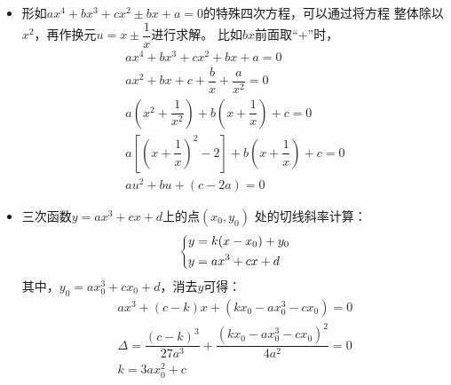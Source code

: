 \begin{itemize}[leftmargin=\inteval{\myitemleftmargin}pt,itemsep=
   \inteval{\myitemitempsep}pt,topsep=\inteval{\myitemtopsep}pt]
\item 形如$ ax^4+bx^3+cx^2\pm bx+a=0 $的特殊四次方程，可以通过将方程
整体除以$ x^2 $，再作换元$ u=x\pm \dfrac{1}{x} $进行求解。
比如$ bx $前面取“+”时，
\begin{gather*}
    ax^4+bx^3+cx^2+bx+a=0 \\
    ax^2+bx+c+\dfrac{b}{x}+\dfrac{a}{x^2}=0 \\
    a\left(x^2+\dfrac{1}{x^2}\right)+b\left(x+\dfrac{1}{x}\right)+c=0 \\
    a\left[\left(x+\dfrac{1}{x}\right)^2-2\right]+b
    \left(x+\dfrac{1}{x}\right)+c=0 \\
    au^2+bu+(c-2a)=0
\end{gather*}

\item 三次函数$ y =ax^3+cx+d $上的点$ (x_0,y_0) $
处的切线斜率计算：
\begin{align*}
\begin{dcases}
    y = k(x-x_0)+y_0  \\
    y = ax^3+cx+d
\end{dcases}
\end{align*}
其中，$ y_0=ax_0^3+cx_0+d $，消去$ y $可得：
\begin{gather*}
ax^3+(c-k)x+(kx_0-ax_0^3-cx_0)=0 \\
\Delta=\dfrac{(c-k)^3}{27a^3}+\dfrac{(kx_0-ax_0^3-cx_0)^2}{4a^2}=0 \\
k=3ax_0^2+c
\end{gather*}

\end{itemize}


